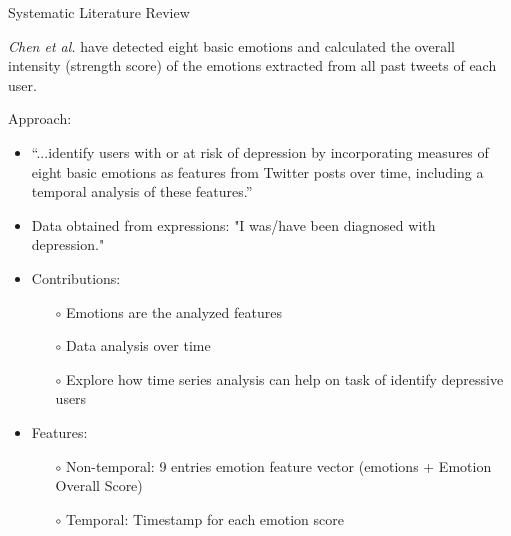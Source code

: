 \documentclass[aspectratio=169,10pt,xcolor={dvipsnames}]{beamer}
\begin{document}
\begin{frame}{Systematic Literature Review}
  \begin{block}{}
    \textit{Chen et al.} have detected eight basic emotions and calculated the overall intensity (strength score) of the emotions extracted from all past tweets of each user\cite{Chen2018}.  
  \end{block}
    
  \begin{block}{\small{Approach:}}
    \begin{itemize}
      \item “...identify users with or at risk of depression by incorporating measures of eight basic emotions as features from Twitter posts over time, including a temporal analysis of these features.”
      \item Data obtained from expressions: "I was/have been diagnosed with depression."  
      \item Contributions:
            \begin{itemize}
              \item[$\circ$] Emotions are the analyzed features
              \item[$\circ$] Data analysis over time
              \item[$\circ$] Explore how time series analysis can help on task of identify depressive users
            \end{itemize}
      \item Features:
      \begin{itemize}
        \item[$\circ$] Non-temporal: 9 entries emotion feature vector (emotions + Emotion Overall Score)        
        \item[$\circ$] Temporal: Timestamp for each emotion score 
      \end{itemize}
    \end{itemize}    
  \end{block}
\end{frame}
\end{document}
